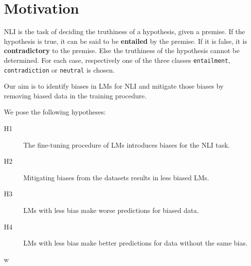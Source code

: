 \section{Motivation}

\ac{NLI} is the task of deciding the truthiness of a hypothesis, given a premise. If the hypothesis is true, it can be said to be \textbf{entailed} by the premise. If it is false, it is \textbf{contradictory} to the premise. Else the truthiness of the hypothesis cannot be determined. For each case, respectively one of the three classes \texttt{entailment}, \texttt{contradiction} or \texttt{neutral} is chosen.

Our aim is to identify biases in \acp{LM} for \ac{NLI} and mitigate those biases by removing biased data in the training procedure.

We pose the following hypotheses:\vspace{-1.5em}
\begin{description}
  \item[H1] The fine-tuning procedure of \acp{LM} introduces biases for the \ac{NLI} task.\vspace{-0.7em}
  \item[H2] Mitigating biases from the datasets results in less biased \acp{LM}.\vspace{-0.7em}
  \item[H3] \acp{LM} with less bias make worse predictions for biased data. \vspace{-0.7em}%
  \item[H4] \acp{LM} with less bias make better predictions for data without the same bias.
\end{description}

w\cite{dissent}